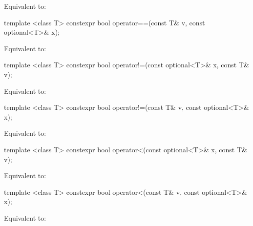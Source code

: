 \begin{itemdescr}
\pnum
\effects
Equivalent to: 
\end{itemdescr}

%
\begin{itemdecl}
template <class T> constexpr bool operator==(const T& v, const optional<T>& x);
\end{itemdecl}

\begin{itemdescr}
\pnum
\effects
Equivalent to: 
\end{itemdescr}

%
\begin{itemdecl}
template <class T> constexpr bool operator!=(const optional<T>& x, const T& v);
\end{itemdecl}

\begin{itemdescr}
\pnum
\effects
Equivalent to: 
\end{itemdescr}

%
\begin{itemdecl}
template <class T> constexpr bool operator!=(const T& v, const optional<T>& x);
\end{itemdecl}

\begin{itemdescr}
\pnum
\effects
Equivalent to: 
\end{itemdescr}

%
\begin{itemdecl}
template <class T> constexpr bool operator<(const optional<T>& x, const T& v);
\end{itemdecl}

\begin{itemdescr}
\pnum
\effects
Equivalent to: 
\end{itemdescr}

%
\begin{itemdecl}
template <class T> constexpr bool operator<(const T& v, const optional<T>& x);
\end{itemdecl}

\begin{itemdescr}
\pnum
\effects
Equivalent to: 
\end{itemdescr}

